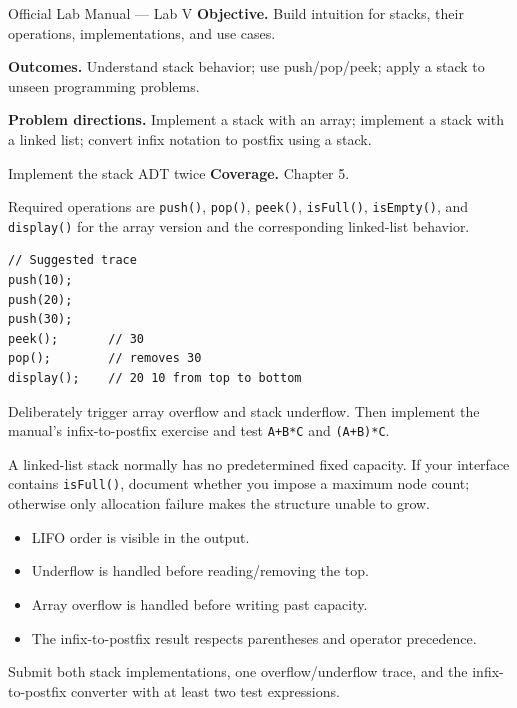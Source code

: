 
\begin{sourcealignment}{Official Lab Manual --- Lab V}
\textbf{Objective.} Build intuition for stacks, their operations, implementations, and use cases.

\textbf{Outcomes.} Understand stack behavior; use push/pop/peek; apply a stack to unseen programming problems.

\textbf{Problem directions.} Implement a stack with an array; implement a stack with a linked list; convert infix notation to postfix using a stack.
\end{sourcealignment}

\begin{labproject}{Implement the stack ADT twice}
\textbf{Coverage.} Chapter 5.

Required operations are \texttt{push()}, \texttt{pop()}, \texttt{peek()}, \texttt{isFull()}, \texttt{isEmpty()}, and \texttt{display()} for the array version and the corresponding linked-list behavior.

\begin{lstlisting}
// Suggested trace
push(10);
push(20);
push(30);
peek();       // 30
pop();        // removes 30
display();    // 20 10 from top to bottom
\end{lstlisting}

\begin{tryit}
Deliberately trigger array overflow and stack underflow. Then implement the manual's infix-to-postfix exercise and test \texttt{A+B*C} and \texttt{(A+B)*C}.
\end{tryit}

\begin{clarification}
A linked-list stack normally has no predetermined fixed capacity. If your interface contains \texttt{isFull()}, document whether you impose a maximum node count; otherwise only allocation failure makes the structure unable to grow.
\end{clarification}
\end{labproject}

\begin{verification}
\begin{itemize}
  \item LIFO order is visible in the output.
  \item Underflow is handled before reading/removing the top.
  \item Array overflow is handled before writing past capacity.
  \item The infix-to-postfix result respects parentheses and operator precedence.
\end{itemize}
\end{verification}

\begin{labdeliverable}
Submit both stack implementations, one overflow/underflow trace, and the infix-to-postfix converter with at least two test expressions.
\end{labdeliverable}
